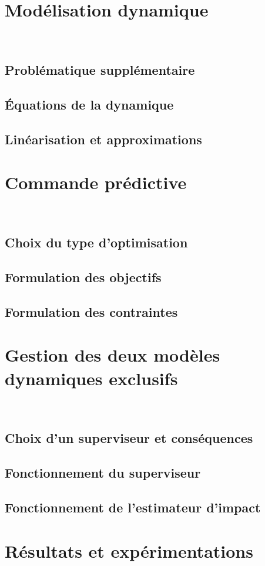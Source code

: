 \section{Modélisation dynamique}~
	\subsection{Problématique supplémentaire}
	\subsection{Équations de la dynamique}
	\subsection{Linéarisation et approximations}
\section{Commande prédictive}~
	\subsection{Choix du type d'optimisation}
	\subsection{Formulation des objectifs}
	\subsection{Formulation des contraintes}
\section{Gestion des deux modèles dynamiques exclusifs}~
	\subsection{Choix d'un superviseur et conséquences}
	\subsection{Fonctionnement du superviseur}
	\subsection{Fonctionnement de l'estimateur d'impact}
\section{Résultats et expérimentations}~
